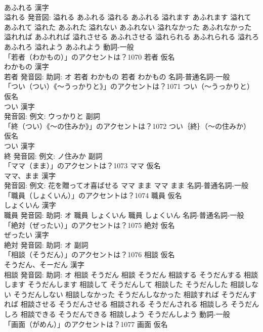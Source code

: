 \documentclass[8pt]{extreport}
\begin{document}
\begin{CJK}{UTF8}{min}
\\	あふれる 漢字　
\\	溢れる 発音図:	溢れる あふれる		溢れる あふれる 溢れます あふれます 溢れて あふれて 溢れた あふれた 溢れない あふれない 溢れなかった あふれなかった 溢れれば あふれれば 溢れさせる あふれさせる 溢れられる あふれられる 溢れろ あふれろ 溢れよう あふれよう				動詞-一般 
\\	「若者（わかもの）」のアクセントは？1070	若者 仮名　
\\	わかもの 漢字　
\\	若者 発音図: 助詞: オ	若者 わかもの		若者 わかもの				名詞-普通名詞-一般 
\\	「つい（つい）《〜うっかりと》」のアクセントは？1071	つい（〜うっかりと） 仮名　
\\	つい 漢字　
\\	発音図: 例文: ウっかりと							副詞 
\\	「終（つい）《〜の住みか》」のアクセントは？1072	つい｛終｝（〜の住みか） 仮名　
\\	つい 漢字　
\\	終 発音図: 例文: ノ住みか							副詞 
\\	「ママ（まま）」のアクセントは？1073	ママ 仮名　
\\	ママ、まま 漢字　
\\	発音図: 例文: 花を贈ってオ喜ばせる	ママ まま		ママ まま				名詞-普通名詞-一般 
\\	「職員（しょくいん）」のアクセントは？1074	職員 仮名　
\\	しょくいん 漢字　
\\	職員 発音図: 助詞: オ	職員 しょくいん		職員 しょくいん				名詞-普通名詞-一般 
\\	「絶対（ぜったい）」のアクセントは？1075	絶対 仮名　
\\	ぜったい 漢字　
\\	絶対 発音図: 助詞: オ							副詞 
\\	「相談（そうだん）」のアクセントは？1076	相談 仮名　
\\	そうだん、そーだん 漢字　
\\	相談 発音図: 助詞: オ	相談 そうだん		相談 そうだん 相談する そうだんする 相談します そうだんします 相談して そうだんして 相談した そうだんした 相談しない そうだんしない 相談しなかった そうだんしなかった 相談すれば そうだんすれば 相談させる そうだんさせる 相談される そうだんされる 相談しろ そうだんしろ 相談できる そうだんできる 相談しよう そうだんしよう				動詞-一般 
\\	「画面（がめん）」のアクセントは？1077	画面 仮名　

\end{CJK}
\end{document}
